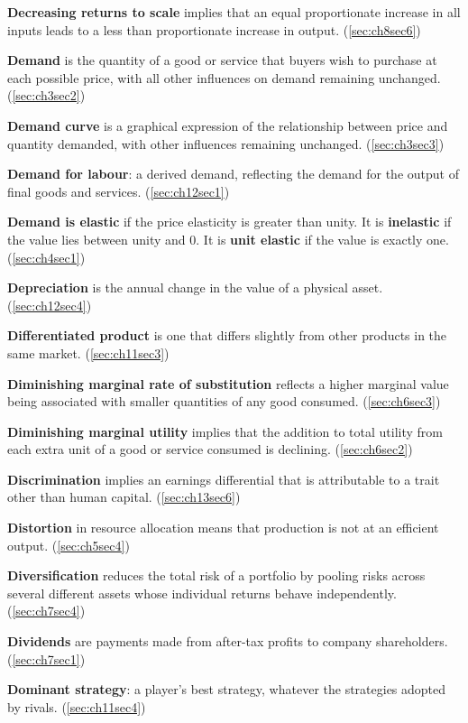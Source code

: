 \textbf{Decreasing returns to scale} implies that an equal proportionate increase in all inputs leads to a less than proportionate increase in output. (\ref{sec:ch8sec6})

\textbf{Demand} is the quantity of a good or service that buyers wish to purchase at each possible price, with all other influences on demand remaining unchanged. (\ref{sec:ch3sec2})

\textbf{Demand curve} is a graphical expression of the relationship between price and quantity demanded, with other influences remaining unchanged. (\ref{sec:ch3sec3})

\textbf{Demand for labour}: a derived demand, reflecting the demand for the output of final goods and services. (\ref{sec:ch12sec1})

\textbf{Demand is elastic} if the price elasticity is greater than unity. It is \textbf{inelastic} if the value lies between unity and 0. It is \textbf{unit elastic} if the value is exactly one. (\ref{sec:ch4sec1})

\textbf{Depreciation} is the annual change in the value of a physical asset. (\ref{sec:ch12sec4})

\textbf{Differentiated product} is one that differs slightly from other products in the same market. (\ref{sec:ch11sec3})

\textbf{Diminishing marginal rate of substitution} reflects a higher marginal value being associated with smaller quantities of any good consumed. (\ref{sec:ch6sec3})

\textbf{Diminishing marginal utility} implies that the addition to total utility from each extra unit of a good or service consumed is declining. (\ref{sec:ch6sec2})

\textbf{Discrimination} implies an earnings differential that is attributable to a trait other than human capital. (\ref{sec:ch13sec6})

\textbf{Distortion} in resource allocation means that production is not at an efficient output. (\ref{sec:ch5sec4})

\textbf{Diversification} reduces the total risk of a portfolio by pooling risks across several different assets whose individual returns behave independently. (\ref{sec:ch7sec4})

\textbf{Dividends} are payments made from after-tax profits to company shareholders. (\ref{sec:ch7sec1})

\textbf{Dominant strategy}: a player's best strategy, whatever the strategies adopted by rivals. (\ref{sec:ch11sec4})

